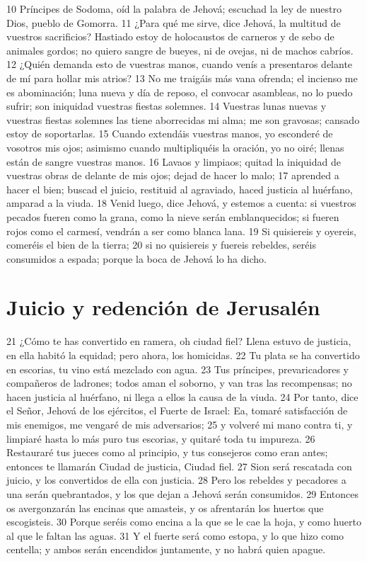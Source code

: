 10 Príncipes de Sodoma, oíd la palabra de Jehová; escuchad la ley de nuestro Dios, pueblo de Gomorra.
11 ¿Para qué me sirve, dice Jehová, la multitud de vuestros sacrificios? Hastiado estoy de holocaustos de carneros y de sebo de animales gordos; no quiero sangre de bueyes, ni de ovejas, ni de machos cabríos.
12 ¿Quién demanda esto de vuestras manos, cuando venís a presentaros delante de mí para hollar mis atrios?
13 No me traigáis más vana ofrenda; el incienso me es abominación; luna nueva y día de reposo, el convocar asambleas, no lo puedo sufrir; son iniquidad vuestras fiestas solemnes.
14 Vuestras lunas nuevas y vuestras fiestas solemnes las tiene aborrecidas mi alma; me son gravosas; cansado estoy de soportarlas.
15 Cuando extendáis vuestras manos, yo esconderé de vosotros mis ojos; asimismo cuando multipliquéis la oración, yo no oiré; llenas están de sangre vuestras manos.
16 Lavaos y limpiaos; quitad la iniquidad de vuestras obras de delante de mis ojos; dejad de hacer lo malo;
17 aprended a hacer el bien; buscad el juicio, restituid al agraviado, haced justicia al huérfano, amparad a la viuda.
18 Venid luego, dice Jehová, y estemos a cuenta: si vuestros pecados fueren como la grana, como la nieve serán emblanquecidos; si fueren rojos como el carmesí, vendrán a ser como blanca lana.
19 Si quisiereis y oyereis, comeréis el bien de la tierra;
20 si no quisiereis y fuereis rebeldes, seréis consumidos a espada; porque la boca de Jehová lo ha dicho.

\section*{Juicio y redención de Jerusalén}

21 ¿Cómo te has convertido en ramera, oh ciudad fiel? Llena estuvo de justicia, en ella habitó la equidad; pero ahora, los homicidas.
22 Tu plata se ha convertido en escorias, tu vino está mezclado con agua.
23 Tus príncipes, prevaricadores y compañeros de ladrones; todos aman el soborno, y van tras las recompensas; no hacen justicia al huérfano, ni llega a ellos la causa de la viuda.
24 Por tanto, dice el Señor, Jehová de los ejércitos, el Fuerte de Israel: Ea, tomaré satisfacción de mis enemigos, me vengaré de mis adversarios;
25 y volveré mi mano contra ti, y limpiaré hasta lo más puro tus escorias, y quitaré toda tu impureza.
26 Restauraré tus jueces como al principio, y tus consejeros como eran antes; entonces te llamarán Ciudad de justicia, Ciudad fiel.
27 Sion será rescatada con juicio, y los convertidos de ella con justicia.
28 Pero los rebeldes y pecadores a una serán quebrantados, y los que dejan a Jehová serán consumidos.
29 Entonces os avergonzarán las encinas que amasteis, y os afrentarán los huertos que escogisteis.
30 Porque seréis como encina a la que se le cae la hoja, y como huerto al que le faltan las aguas.
31 Y el fuerte será como estopa, y lo que hizo como centella; y ambos serán encendidos juntamente, y no habrá quien apague.

